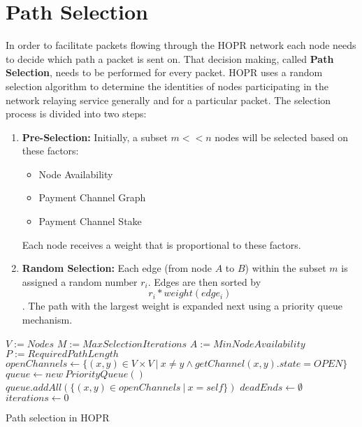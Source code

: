\section{Path Selection}
\label{sec:pathselection}

In order to facilitate packets flowing through the HOPR network each node needs
to decide which path a packet is sent on. That decision making, called
\textbf{Path Selection}, needs to be performed for every packet. HOPR uses a
random selection algorithm to determine the identities of nodes participating in
the network relaying service generally and for a particular packet.
The selection process is divided into two steps:

\begin{enumerate}

    \item \textbf{Pre-Selection:}
          Initially, a subset $m<<n$ nodes will be selected based on these factors:
          \begin{itemize}
              \item Node Availability
              \item Payment Channel Graph
              \item Payment Channel Stake
          \end{itemize}
          Each node receives a weight that is proportional to these factors.

    \item \textbf{Random Selection:} Each edge (from node $A$ to $B$) within the subset
      $m$ is assigned a random number $r_i$. Edges are then sorted by
      $$r_i*weight(edge_i)$$. The path with the largest weight is expanded next
      using a priority queue mechanism.

\end{enumerate}

\begin{algorithm}[H]
    \SetAlgoNoLine
    \DontPrintSemicolon
    $V := Nodes$\;
    $M := MaxSelectionIterations$\;
    $A := MinNodeAvailability$\;
    $P := RequiredPathLength$\;
    \;
    $openChannels \leftarrow \{ (x, y) \in V \times V \ | \ x \ne y \land getChannel(x,y).state = OPEN \}$\;
    $queue \leftarrow new \ PriorityQueue()$\;
    $queue.addAll(\{ (x,y) \in openChannels \ | \ x = self \})$\;
    $deadEnds \leftarrow \emptyset$\;
    $iterations \leftarrow 0$\;
    \;
    \Return{$\bot$}
    \caption{Path selection in HOPR}
\end{algorithm}

